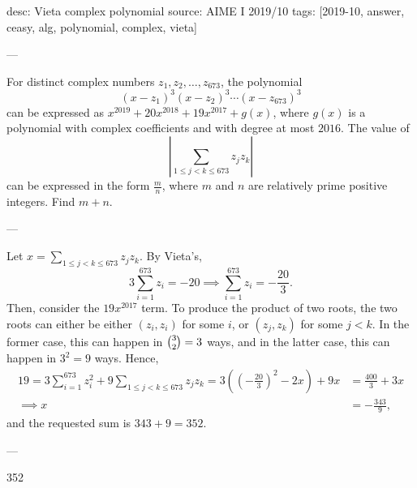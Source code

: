 desc: Vieta complex polynomial
source: AIME I 2019/10
tags: [2019-10, answer, ceasy, alg, polynomial, complex, vieta]

---

For distinct complex numbers $z_1,z_2,\ldots,z_{673}$, the polynomial \[(x-z_1)^3(x-z_2)^3\cdots(x-z_{673})^3\]
can be expressed as $x^{2019}+20x^{2018}+19x^{2017}+g(x)$, where $g(x)$ is a polynomial with complex coefficients and with degree at most $2016$. The value of \[\left|\sum_{1\le j<k\le 673}z_jz_k\right|\]
can be  expressed in the form $\tfrac mn$, where $m$ and $n$ are relatively prime positive integers. Find $m+n$.

---

Let $x=\sum_{1\le j<k\le 673} z_jz_k$. By Vieta's, \[3\sum_{i=1}^{673}z_i=-20\implies \sum_{i=1}^{673}z_i=-\frac{20}3.\]
Then, consider the $19x^{2017}$ term. To produce the product of two roots, the two roots can either be either $(z_i,z_i)$ for some $i$, or $(z_j,z_k)$ for some $j<k$. In the former case, this can happen in $\tbinom 32=3$ ways, and in the latter case, this can happen in $3^2=9$ ways. Hence,
\begin{align*}
    19=3\sum_{i=1}^{673} z_i^2+9\sum_{1\le j<k\le 673} z_jz_k=3\left(\left(-\frac{20}3\right)^2-2x\right)+9x&=\frac{400}3+3x\\
    \implies x&=-\frac{343}9,
\end{align*}
and the requested sum is $343+9=352$.

---

352
